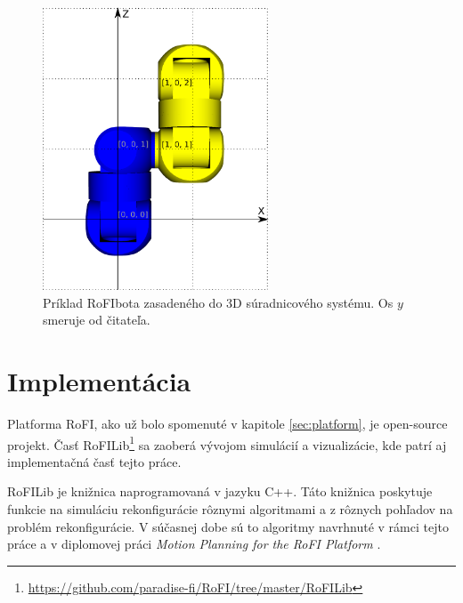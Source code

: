 \documentclass[
  digital, %
  oneside, %
  table,   %
  lof,     %
  nolot,     %
]{fithesis3}
\begin{document}
\begin{figure}[hbt!]
    \centering
    \includegraphics[width=0.6\textwidth]{pictures/module_coordinates.pdf}
    \caption[Ukážka súradnicového systému]{Príklad RoFIbota zasadeného do 3D súradnicového systému. Os $y$ smeruje od čitateľa. }
    \label{fig:moduleCoordinates}
\end{figure}







\chapter{Implementácia}
\label{sec:implementation}
Platforma RoFI, ako už bolo spomenuté v kapitole \ref{sec:platform}, je open-source projekt. Časť RoFILib\footnote{\url{https://github.com/paradise-fi/RoFI/tree/master/RoFILib}} sa zaoberá vývojom simulácií a vizualizácie, kde patrí aj implementačná časť tejto práce. 

RoFILib je knižnica naprogramovaná v jazyku C++. Táto knižnica poskytuje funkcie na simuláciu rekonfigurácie rôznymi algoritmami a z rôznych pohľadov na problém rekonfigurácie. V súčasnej dobe sú to algoritmy navrhnuté v rámci tejto práce a v diplomovej práci \textit{Motion Planning for the RoFI Platform} \cite{vozarovaMasterThesis}.
\end{document}
